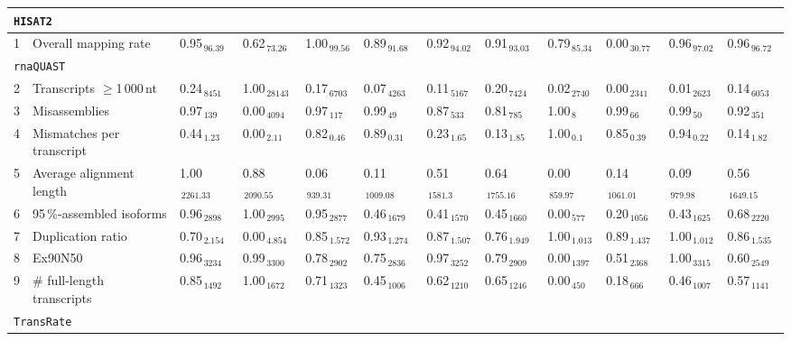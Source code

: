 \documentclass{scrartcl}
\begin{document}
\begin{landscape}
\begin{table}
\begin{scriptsize}
\begin{tabular}{llllllllllll}
\multicolumn{11}{l}{\texttt{HISAT2}}\\ 
\midrule
1 & Overall mapping rate  & 0.95$_{\,96.39}$ & 0.62$_{\,73.26}$ & 1.00$_{\,99.56}$ & 0.89$_{\,91.68}$ & 0.92$_{\,94.02}$ & 0.91$_{\,93.03}$ & 0.79$_{\,85.34}$ & 0.00$_{\,30.77}$ & 0.96$_{\,97.02}$ & 0.96$_{\,96.72}$ \\\midrule
\multicolumn{11}{l}{\texttt{rnaQUAST}}\\ 
\midrule
2 & Transcripts $\geq$1\,000\,nt  & 0.24$_{\,8451}$ & 1.00$_{\,28143}$ & 0.17$_{\,6703}$ & 0.07$_{\,4263}$ & 0.11$_{\,5167}$ & 0.20$_{\,7424}$ & 0.02$_{\,2740}$ & 0.00$_{\,2341}$ & 0.01$_{\,2623}$ & 0.14$_{\,6053}$ \\3 & Misassemblies  & 0.97$_{\,139}$ & 0.00$_{\,4094}$ & 0.97$_{\,117}$ & 0.99$_{\,49}$ & 0.87$_{\,533}$ & 0.81$_{\,785}$ & 1.00$_{\,8}$ & 0.99$_{\,66}$ & 0.99$_{\,50}$ & 0.92$_{\,351}$ \\4 & Mismatches per transcript  & 0.44$_{\,1.23}$ & 0.00$_{\,2.11}$ & 0.82$_{\,0.46}$ & 0.89$_{\,0.31}$ & 0.23$_{\,1.65}$ & 0.13$_{\,1.85}$ & 1.00$_{\,0.1}$ & 0.85$_{\,0.39}$ & 0.94$_{\,0.22}$ & 0.14$_{\,1.82}$ \\5 & Average alignment length  & 1.00$_{\,2261.33}$ & 0.88$_{\,2090.55}$ & 0.06$_{\,939.31}$ & 0.11$_{\,1009.08}$ & 0.51$_{\,1581.3}$ & 0.64$_{\,1755.16}$ & 0.00$_{\,859.97}$ & 0.14$_{\,1061.01}$ & 0.09$_{\,979.98}$ & 0.56$_{\,1649.15}$ \\6 & 95\,\%-assembled isoforms  & 0.96$_{\,2898}$ & 1.00$_{\,2995}$ & 0.95$_{\,2877}$ & 0.46$_{\,1679}$ & 0.41$_{\,1570}$ & 0.45$_{\,1660}$ & 0.00$_{\,577}$ & 0.20$_{\,1056}$ & 0.43$_{\,1625}$ & 0.68$_{\,2220}$ \\7 & Duplication ratio  & 0.70$_{\,2.154}$ & 0.00$_{\,4.854}$ & 0.85$_{\,1.572}$ & 0.93$_{\,1.274}$ & 0.87$_{\,1.507}$ & 0.76$_{\,1.949}$ & 1.00$_{\,1.013}$ & 0.89$_{\,1.437}$ & 1.00$_{\,1.012}$ & 0.86$_{\,1.535}$ \\\midrule
8 & Ex90N50  & 0.96$_{\,3234}$ & 0.99$_{\,3300}$ & 0.78$_{\,2902}$ & 0.75$_{\,2836}$ & 0.97$_{\,3252}$ & 0.79$_{\,2909}$ & 0.00$_{\,1397}$ & 0.51$_{\,2368}$ & 1.00$_{\,3315}$ & 0.60$_{\,2549}$ \\9 & \# full-length transcripts  & 0.85$_{\,1492}$ & 1.00$_{\,1672}$ & 0.71$_{\,1323}$ & 0.45$_{\,1006}$ & 0.62$_{\,1210}$ & 0.65$_{\,1246}$ & 0.00$_{\,450}$ & 0.18$_{\,666}$ & 0.46$_{\,1007}$ & 0.57$_{\,1141}$ \\\midrule
\multicolumn{11}{l}{\texttt{TransRate}}\\ 
\midrule

\end{tabular}
\end{scriptsize}
\end{table}
\end{landscape}
\end{document}
